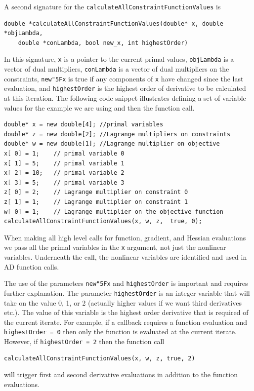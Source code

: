 \documentclass[11pt]{article}
\renewcommand{\_}{{\char"5F}}
\renewcommand{\{}{{\char"7B}}
\renewcommand{\}}{{\char"7D}}
\renewcommand{\^}{{\char"0D}}
\renewcommand{\'}{{\char"0D}}
\begin{document}
\begin{enumerate}[Step 1:]
A second signature for the {\tt calculateAllConstraintFunctionValues} is
\begin{verbatim}
double *calculateAllConstraintFunctionValues(double* x, double *objLambda,
    double *conLambda, bool new_x, int highestOrder)
\end{verbatim}
In this  signature, {\tt x} is a pointer to the current primal values, {\tt objLambda} is a vector of dual multipliers, 
{\tt conLambda} is a vector of dual multipliers on the constraints,  {\tt new\_x} is true if any components of {\tt x} 
have changed since the last evaluation, and {\tt highestOrder} is the highest order of derivative to be calculated 
at this iteration. The following code snippet illustrates defining a set of variable values for the example we are 
using and then the function call.
\begin{verbatim}
double* x = new double[4]; //primal variables
double* z = new double[2]; //Lagrange multipliers on constraints
double* w = new double[1]; //Lagrange multiplier on objective
x[ 0] = 1;    // primal variable 0
x[ 1] = 5;    // primal variable 1
x[ 2] = 10;   // primal variable 2
x[ 3] = 5;    // primal variable 3
z[ 0] = 2;    // Lagrange multiplier on constraint 0
z[ 1] = 1;    // Lagrange multiplier on constraint 1
w[ 0] = 1;    // Lagrange multiplier on the objective function
calculateAllConstraintFunctionValues(x, w, z,  true, 0);
\end{verbatim}
When making all high level calls for function, gradient, and Hessian evaluations we pass all the 
primal variables in the {\tt x} argument, not just the nonlinear variables. Underneath the call, 
the nonlinear variables are identified and used in AD function calls.

The use of the parameters  {\tt new\_x} and {\tt highestOrder}  is important and requires further explanation.    
The parameter  {\tt highestOrder}  is an integer variable that will take on the value 0, 1, or 2 (actually 
higher values if we want third derivatives etc.).  The value of this variable is the highest order derivative 
that is required of the current iterate. For example, if  a callback requires a function evaluation and 
{\tt highestOrder = 0} then only the function is evaluated at the current iterate.  However,  
if {\tt highestOrder = 2} then the function call
\begin{verbatim}
calculateAllConstraintFunctionValues(x, w, z, true, 2)
\end{verbatim}
will trigger  first and second derivative evaluations in addition to the function evaluations.


\end{enumerate}
\end{document}
